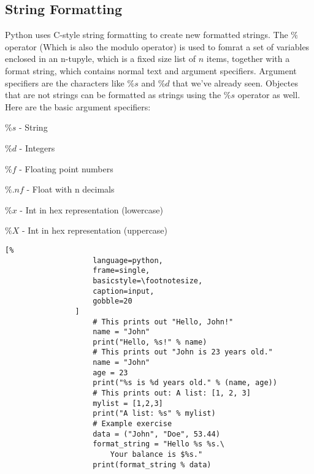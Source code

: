 \documentclass[crop=false,class=book]{standalone}
\begin{document}
        \subsection{String Formatting}
            Python uses C-style string formatting to create new
            formatted strings. The $\%$ operator (Which is also the
            modulo operator) is used to fomrat a set of variables
            enclosed in an n-tupyle, which is a fixed size list of
            $n$ items, together with a format string, which contains
            normal text and argument specifiers. Argument specifiers
            are the characters like $\%s$ and $\%d$ that we've
            already seen. Objectes that are not strings can be
            formatted as strings using the $\%s$ operator as well.
            Here are the basic argument specifiers:
            \begin{itemize}
                \begin{multicols}{2}
                    \item $\%s$ - String
                    \item $\%d$ - Integers
                    \item $\%f$ - Floating point numbers
                    \item $\%.nf$ - Float with n decimals
                    \item $\%x$ - Int in hex representation
                        (lowercase)
                    \item $\%X$ - Int in hex representation
                        (uppercase)
                \end{multicols}
            \end{itemize}
            \begin{minipage}[t]{.48\textwidth}
                \centering
                \begin{lstlisting}[%
                    language=python,
                    frame=single,
                    basicstyle=\footnotesize,
                    caption=input,
                    gobble=20
                ]
                    # This prints out "Hello, John!"
                    name = "John"
                    print("Hello, %s!" % name)
                    # This prints out "John is 23 years old."
                    name = "John"
                    age = 23
                    print("%s is %d years old." % (name, age))
                    # This prints out: A list: [1, 2, 3]
                    mylist = [1,2,3]
                    print("A list: %s" % mylist)
                    # Example exercise
                    data = ("John", "Doe", 53.44)
                    format_string = "Hello %s %s.\ 
                        Your balance is $%s."
                    print(format_string % data)

                \end{lstlisting}
            \end{minipage}\hfill
\end{document}
